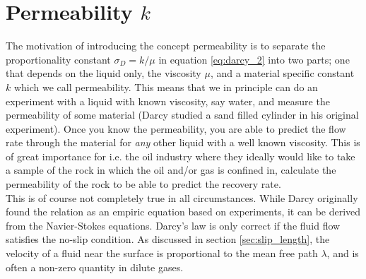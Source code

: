 \section{Permeability $k$}
\label{sec:permeability}
The motivation of introducing the concept permeability is to separate the proportionality constant $\sigma_D = k/\mu$ in equation \eqref{eq:darcy_2} into two parts; one that depends on the liquid only, the viscosity $\mu$, and a material specific constant $k$ which we call permeability. This means that we in principle can do an experiment with a liquid with known viscosity, say water, and measure the permeability of some material (Darcy studied a sand filled cylinder in his original experiment). Once you know the permeability, you are able to predict the flow rate through the material for \textit{any} other liquid with a well known viscosity. This is of great importance for i.e. the oil industry where they ideally would like to take a sample of the rock in which the oil and/or gas is confined in, calculate the permeability of the rock to be able to predict the recovery rate.\\
This is of course not completely true in all circumstances. While Darcy originally found the relation as an empiric equation based on experiments, it can be derived from the Navier-Stokes equations. Darcy's law is only correct if the fluid flow satisfies the no-slip condition. As discussed in section \ref{sec:slip_length}, the velocity of a fluid near the surface is proportional to the mean free path $\lambda$, and is often a non-zero quantity in dilute gases.  

